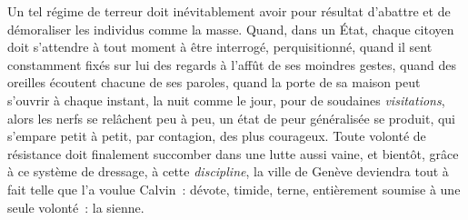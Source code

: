 \documentclass[french,twoside]{book} %
\newcommand{\astermono}{\medskip\centerline{\color{rubric}\large\selectfont{\syms ✻}}\medskip\par}%
\begin{document}
Un tel régime de terreur doit inévitablement avoir pour résultat d’abattre et de démoraliser les individus comme la masse. Quand, dans un État, chaque citoyen doit s’attendre à tout moment à être interrogé, perquisitionné, quand il sent constamment fixés sur lui des regards à l’affût de ses moindres gestes, quand des oreilles écoutent chacune de ses paroles, quand la porte de sa maison peut s’ouvrir à chaque instant, la nuit comme le jour, pour de soudaines \emph{visitations}, alors les nerfs se relâchent peu à peu, un état de peur généralisée se produit, qui s’empare petit à petit, par contagion, des plus courageux. Toute volonté de résistance doit finalement succomber dans une lutte aussi vaine, et bientôt, grâce à ce système de dressage, à cette \emph{discipline}, la ville de Genève deviendra tout à fait telle que l’a voulue Calvin : dévote, timide, terne, entièrement soumise à une seule volonté : la sienne.\par

\astermono
\end{document}
